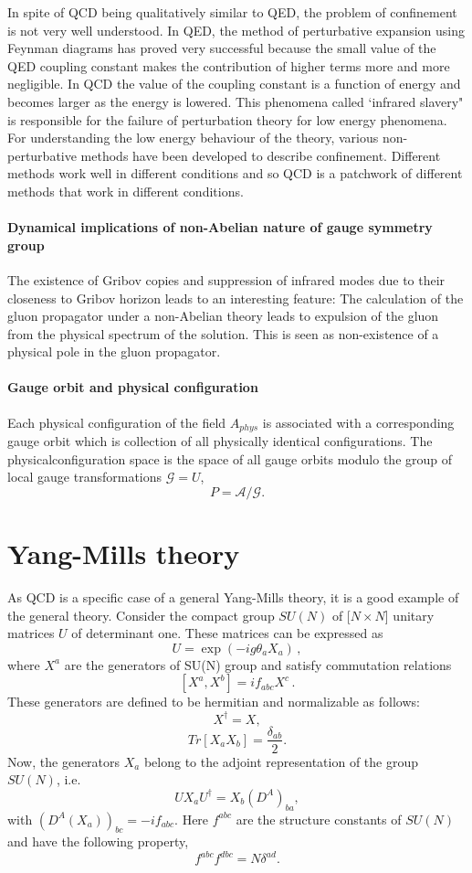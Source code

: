In spite of QCD being qualitatively similar to QED, the problem of
confinement is not very well understood. In QED, the method of
perturbative expansion using Feynman diagrams has proved very successful
because the small value of the QED coupling constant makes the
contribution of higher terms more and more negligible. In QCD the value
of the coupling constant is a function of energy and becomes larger as
the energy is lowered. This phenomena called `infrared slavery" is
responsible for the failure of perturbation theory for low energy
phenomena. For understanding the low energy behaviour of the theory,
various non-perturbative methods have been developed to describe
confinement. Different methods work well in different conditions and so
QCD is a patchwork of different methods that work in different
conditions.

\paragraph{Dynamical implications of non-Abelian nature of gauge symmetry
group}
The existence of Gribov copies and suppression of infrared modes due to
their closeness to Gribov horizon leads to an interesting feature: The
calculation of the gluon propagator under a non-Abelian theory leads to
expulsion of the gluon from the physical spectrum of the solution. This
is seen as non-existence of a physical pole in the gluon propagator.

\paragraph{Gauge orbit and physical configuration}
Each physical configuration of the field $ A_{phys} $ is associated with
a corresponding gauge orbit which is collection of all physically
identical configurations. The physicalconfiguration space is the space of
all gauge orbits modulo the group of local gauge transformations
$\mathcal{G}={U}$, $$P=\mathcal{A}/\mathcal{G}.$$


\section{Yang-Mills theory}
As QCD is a specific case of a general Yang-Mills theory, it is a good
example of the general theory. Consider the compact group $SU(N)$ of
[$N\!\times\!N$]
unitary matrices $U$ of determinant one. These matrices can be expressed
as
\[
U = \exp(-ig\theta_{a}X_{a})
\,,
\]
where $X^{a}$ are the generators of
SU(N) group and satisfy commutation relations
\[
[X^{a},X^{b}]=i f_{abc}X^{c}
\,.
\]
These generators are defined to be hermitian and normalizable
as follows: $$X^{\dagger}=X,$$ $$Tr[X_{a}X_{b}]=\frac{\delta_{ab}}{2}.$$
Now, the generators $X_{a}$ belong to the adjoint representation of the
group $SU(N)$, i.e. $$U X_{a}U^{\dagger}=X_{b} (D^{A})_{ba},$$ with
$(D^{A}(X_{a}))_{bc}=-if_{abc}$. Here $f^{abc}$ are the structure
constants of $SU(N)$ and have the following property, $$f^{abc}f^{dbc}=N
\delta^{ad}.$$

